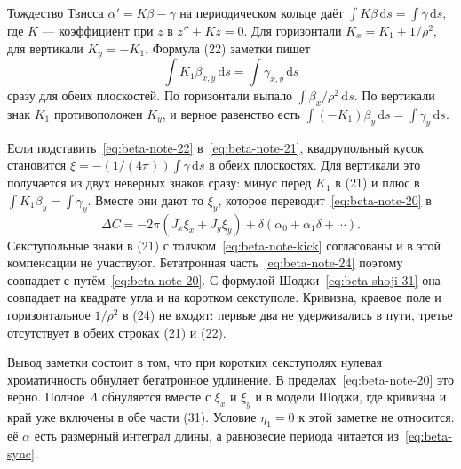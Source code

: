 Тождество Твисса $\alpha'=K\beta-\gamma$ на периодическом кольце даёт $\int K\beta\,\mathrm{d}s=\int\gamma\,\mathrm{d}s$, где $K$ --- коэффициент при $z$ в $z''+Kz=0$. Для горизонтали $K_x=K_1+1/\rho^2$, для вертикали $K_y=-K_1$. Формула (22) заметки пишет
\begin{equation}
\label{eq:beta-note-22}
\int K_1\beta_{x,y}\,\mathrm{d}s=\int\gamma_{x,y}\,\mathrm{d}s
\end{equation}
сразу для обеих плоскостей. По горизонтали выпало $\int\beta_x/\rho^2\,\mathrm{d}s$. По вертикали знак $K_1$ противоположен $K_y$, и верное равенство есть $\int(-K_1)\beta_y\,\mathrm{d}s=\int\gamma_y\,\mathrm{d}s$.

Если подставить~\eqref{eq:beta-note-22} в~\eqref{eq:beta-note-21}, квадрупольный кусок становится $\xi=-(1/(4\pi))\int\gamma\,\mathrm{d}s$ в обеих плоскостях. Для вертикали это получается из двух неверных знаков сразу: минус перед $K_1$ в (21) и плюс в $\int K_1\beta_y=\int\gamma_y$. Вместе они дают то $\xi_y$, которое переводит~\eqref{eq:beta-note-20} в
\begin{equation}
\label{eq:beta-note-24}
\Delta C
=-2\pi(J_x\xi_x+J_y\xi_y)
+\delta(\alpha_0+\alpha_1\delta+\cdots).
\end{equation}
Секступольные знаки в (21) с толчком~\eqref{eq:beta-note-kick} согласованы и в этой компенсации не участвуют. Бетатронная часть~\eqref{eq:beta-note-24} поэтому совпадает с путём~\eqref{eq:beta-note-20}. С формулой Шоджи~\eqref{eq:beta-shoji-31} она совпадает на квадрате угла и на коротком секступоле. Кривизна, краевое поле и горизонтальное $1/\rho^2$ в (24) не входят: первые два не удерживались в пути, третье отсутствует в обеих строках (21) и (22).

Вывод заметки состоит в том, что при коротких секступолях нулевая хроматичность обнуляет бетатронное удлинение. В пределах~\eqref{eq:beta-note-20} это верно. Полное $\Lambda$ обнуляется вместе с $\xi_x$ и $\xi_y$ и в модели Шоджи, где кривизна и край уже включены в обе части (31). Условие $\eta_1=0$ к этой заметке не относится: её $\alpha$ есть размерный интеграл длины, а равновесие периода читается из~\eqref{eq:beta-sync}.
